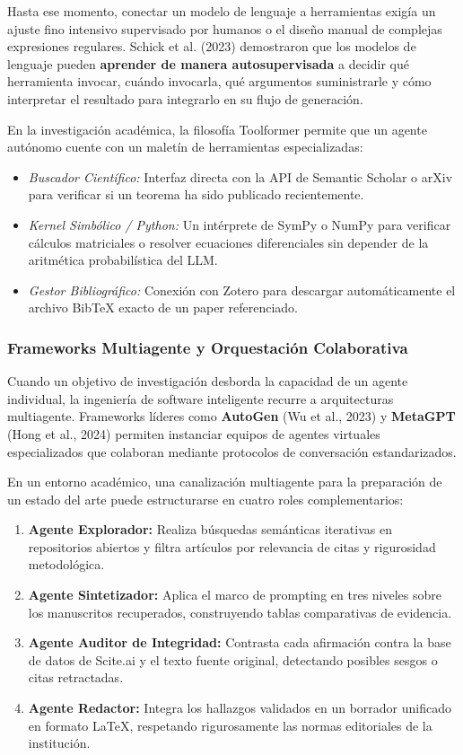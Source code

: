 Hasta ese momento, conectar un modelo de lenguaje a herramientas exigía un ajuste fino intensivo supervisado por humanos o el diseño manual de complejas expresiones regulares. Schick et al. (2023) demostraron que los modelos de lenguaje pueden \textbf{aprender de manera autosupervisada} a decidir qué herramienta invocar, cuándo invocarla, qué argumentos suministrarle y cómo interpretar el resultado para integrarlo en su flujo de generación.

En la investigación académica, la filosofía Toolformer permite que un agente autónomo cuente con un maletín de herramientas especializadas:
\begin{itemize}
    \item \textit{Buscador Científico:} Interfaz directa con la API de Semantic Scholar o arXiv para verificar si un teorema ha sido publicado recientemente.
    \item \textit{Kernel Simbólico / Python:} Un intérprete de SymPy o NumPy para verificar cálculos matriciales o resolver ecuaciones diferenciales sin depender de la aritmética probabilística del LLM.
    \item \textit{Gestor Bibliográfico:} Conexión con Zotero para descargar automáticamente el archivo BibTeX exacto de un paper referenciado.
\end{itemize}

\subsubsection{Frameworks Multiagente y Orquestación Colaborativa}

Cuando un objetivo de investigación desborda la capacidad de un agente individual, la ingeniería de software inteligente recurre a arquitecturas multiagente. Frameworks líderes como \textbf{AutoGen} (Wu et al., 2023) y \textbf{MetaGPT} (Hong et al., 2024) permiten instanciar equipos de agentes virtuales especializados que colaboran mediante protocolos de conversación estandarizados.

En un entorno académico, una canalización multiagente para la preparación de un estado del arte puede estructurarse en cuatro roles complementarios:
\begin{enumerate}
    \item \textbf{Agente Explorador:} Realiza búsquedas semánticas iterativas en repositorios abiertos y filtra artículos por relevancia de citas y rigurosidad metodológica.
    \item \textbf{Agente Sintetizador:} Aplica el marco de prompting en tres niveles sobre los manuscritos recuperados, construyendo tablas comparativas de evidencia.
    \item \textbf{Agente Auditor de Integridad:} Contrasta cada afirmación contra la base de datos de Scite.ai y el texto fuente original, detectando posibles sesgos o citas retractadas.
    \item \textbf{Agente Redactor:} Integra los hallazgos validados en un borrador unificado en formato LaTeX, respetando rigurosamente las normas editoriales de la institución.
\end{enumerate}

